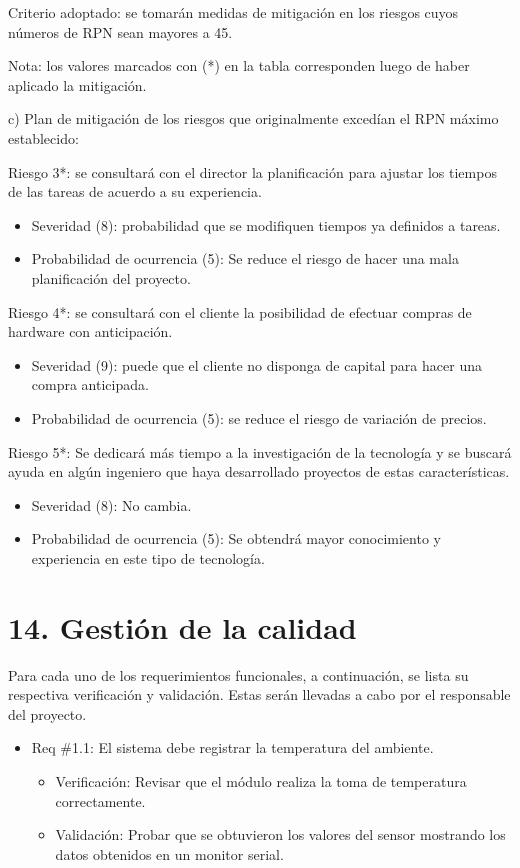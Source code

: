 \documentclass[
11pt, %
]{charter}
\begin{document}
Criterio adoptado: se tomarán medidas de mitigación en los riesgos cuyos números de RPN sean mayores a 45.

Nota: los valores marcados con (*) en la tabla corresponden luego de haber aplicado la mitigación.

c) Plan de mitigación de los riesgos que originalmente excedían el RPN máximo establecido:
 
Riesgo 3*: se consultará con el director la planificación para ajustar los tiempos de las tareas de acuerdo a su experiencia.
  \begin{itemize}
	\item Severidad (8): probabilidad que se modifiquen tiempos ya definidos a tareas.
	\item Probabilidad de ocurrencia (5): Se reduce el riesgo de hacer una mala planificación del proyecto.
	\end{itemize}

Riesgo 4*: se consultará con el cliente la posibilidad de efectuar compras de hardware con anticipación.
  \begin{itemize}
	\item Severidad (9): puede que el cliente no disponga de capital para hacer una compra anticipada.
	\item Probabilidad de ocurrencia (5): se reduce el riesgo de variación de precios.
	\end{itemize}

Riesgo 5*: Se dedicará más tiempo a la investigación de la tecnología y se buscará ayuda en algún ingeniero que haya desarrollado proyectos de estas características.
  \begin{itemize}
	\item Severidad (8): No cambia.
	\item Probabilidad de ocurrencia (5): Se obtendrá mayor conocimiento y experiencia en este tipo de tecnología.
	\end{itemize}


\section{14. Gestión de la calidad}
\label{sec:calidad}

Para cada uno de los requerimientos funcionales, a continuación, se lista su respectiva verificación y validación. Estas serán llevadas a cabo por el responsable del proyecto.

\begin{itemize} 
\item Req \#1.1: El sistema debe registrar la temperatura del ambiente.
\begin{itemize}
	\item Verificación: Revisar que el módulo realiza la toma de temperatura correctamente.
	\item Validación: Probar que se obtuvieron los valores del sensor mostrando los datos obtenidos en un monitor serial.
\end{itemize}
\end{itemize}
\end{document}
